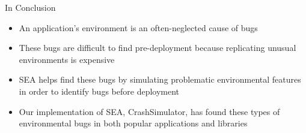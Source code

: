 \documentclass[pdf]{beamer}
\begin{document}

\begin{frame}{In Conclusion}
  \begin{itemize}
    \item{An application's environment is an often-neglected cause of bugs}
    \item{These bugs are difficult to find pre-deployment because replicating
      unusual environments is expensive}
    \item{SEA helps find these bugs by simulating problematic environmental
        features in order to identify bugs before deployment}
    \item{Our implementation of SEA, CrashSimulator, has found these types
      of environmental bugs in both popular applications and libraries}
  \end{itemize}
\end{frame}

\end{document}
